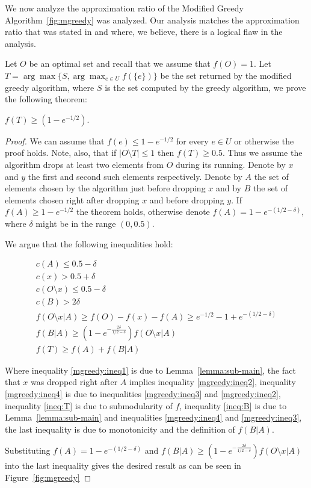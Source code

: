 We now analyze the approximation ratio of the
Modified Greedy Algorithm~\ref{fig:mgreedy} was analyzed.
Our analysis matches the approximation ratio that was stated in
\cite{khuller1999budgeted} and \cite{krause2005note} where, we believe, 
there is a logical flaw in the analysis.


Let $O$ be an optimal set and recall that we assume that $f(O) = 1$.
Let $T = \arg\max\{S, \displaystyle{\arg\max_{e \in U}}f(\{e\})\}$
be the set returned by the modified greedy algorithm,
where $S$ is the set computed by the greedy algorithm,
we prove the following theorem:

\begin{theorem}
	$f(T) \geq (1 - e^{-1/2})$.
\end{theorem}

\begin{proof}
	We can assume that $f(e) \leq 1 - e^{-1/2}$ for every $e \in U$ or otherwise the proof holds.
	Note, also, that if $|O \setminus T| \leq 1$ then $f(T) \geq 0.5$.
	Thus we assume the algorithm drops at least two elements from $O$ during its running.
	Denote by $x$ and $y$ the first and second such elements respectively.
	Denote by $A$ the set of elements chosen by the algorithm just before dropping $x$ and by
	$B$ the set of elements chosen right after dropping $x$ and before dropping $y$.
	If $f(A) \geq 1 - e^{-1/2}$ the theorem holds, otherwise denote $f(A) = 1 - e^{-(1/2 - \delta)}$,
	where $\delta$ might be in the range $(0, 0.5)$.

	We argue that the following inequalities hold:

	\begin{align}
		\label{mgreedy:ineq1}
		c(A) \leq 0.5 - \delta
		\\
		\label{mgreedy:ineq2}
		c(x) > 0.5 + \delta
		\\
		\label{mgreedy:ineq3}
		c(O \setminus x) \leq 0.5 - \delta
		\\
		\label{mgreedy:ineq4}
		c(B) > 2\delta
		\\
		\label{ineq:T}
		f(O \setminus x | A) \geq f(O) - f(x) - f(A) \geq e^{-1/2} - 1 + e^{-(1/2 - \delta)}
		\\
		\label{ineq:B}
		f(B|A) \geq (1 - e^{-\frac{2\delta}{1/2 - \delta}})f(O \setminus x | A)
		\\
		f(T) \geq f(A) + f(B|A)
	\end{align}

	Where inequality \ref{mgreedy:ineq1} is due to Lemma~\ref{lemma:sub-main},
	the fact that $x$ was dropped right after $A$ implies inequality \ref{mgreedy:ineq2},
	inequality \ref{mgreedy:ineq4} is due to inequalities \ref{mgreedy:ineq3} and
	\ref{mgreedy:ineq2},
	inequality \ref{ineq:T} is due to submodularity of $f$,
	inequality \ref{ineq:B} is due to Lemma~\ref{lemma:sub-main} and inequalities
	\ref{mgreedy:ineq4} and \ref{mgreedy:ineq3},
	the last inequality is due to monotonicity and the definition of $f(B|A)$.

	Substituting $f(A) = 1 - e^{-(1/2 - \delta)}$
	and $f(B|A) \geq (1 - e^{-\frac{2\delta}{1/2 - \delta}})f(O \setminus x | A)$
	into the last inequality gives the desired result as can be seen in Figure~\ref{fig:mgreedy}
\end{proof}

